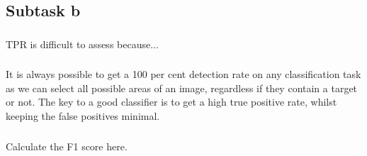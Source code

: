 \documentclass[conference]{IEEEtran}
\begin{document}
\subsection{Subtask b}
\subsubsection{}
TPR is difficult to assess because...
\subsubsection{}
It is always possible to get a 100 per cent detection rate on any classification task as we can select all possible areas of an image, regardless if they contain a target or not. The key to a good classifier is to get a high true positive rate, whilst keeping the false positives minimal. 

\subsubsection{}
Calculate the F1 score here. 
\end{document}
